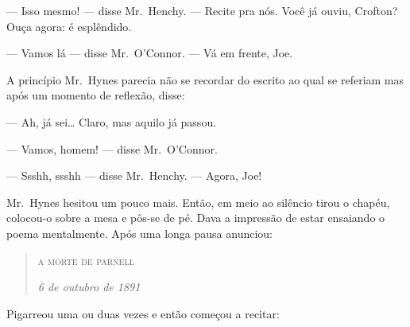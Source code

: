 --- Isso mesmo! --- disse Mr.~Henchy.  --- Recite pra nós.  Você já ouviu,
Crofton? Ouça agora: é esplêndido.

--- Vamos lá --- disse Mr.~O’Connor.  --- Vá em frente, Joe.

A princípio Mr.~Hynes parecia não se recordar do escrito ao qual se referiam
mas após um momento de reflexão, disse:

--- Ah, já sei\ldots{} Claro, mas aquilo já passou.

--- Vamos, homem! --- disse Mr.~O’Connor.

--- Ssshh, ssshh --- disse Mr.~Henchy.  --- Agora, Joe!

Mr.~Hynes hesitou um pouco mais.  Então, em meio ao silêncio tirou o chapéu,
colocou-o sobre a mesa e pôs-se de pé.  Dava a impressão de estar ensaiando o
poema mentalmente.  Após uma longa pausa anunciou:

\begin{quote}\centering
\textsc{a morte de parnell}

\textit{6 de outubro de 1891}
\end{quote}

Pigarreou uma ou duas vezes e então começou a recitar:

